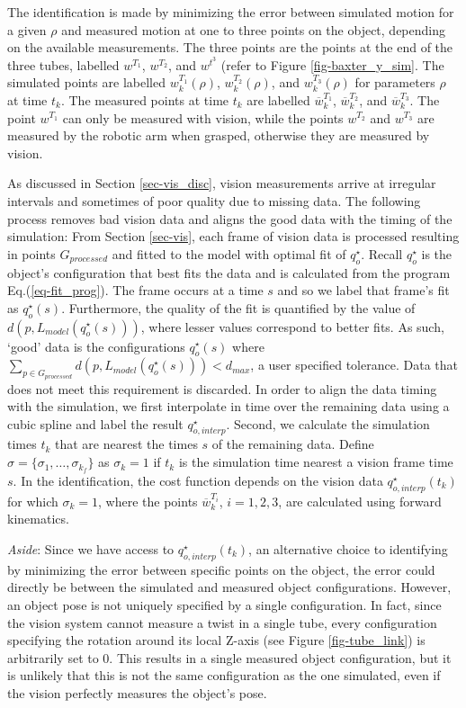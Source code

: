 \documentclass[runningheads,a4paper]{llncs}
\begin{document}
The identification is made by minimizing the error between simulated motion for a given $\rho$ and measured motion at one to three points on the object, depending on the available measurements. The three points are the points at the end of the three tubes, labelled $w^{T_1}$, $w^{T_2}$, and $w^{t^3}$ (refer to Figure \ref{fig-baxter_y_sim}. The simulated points are labelled $w_k^{T_1}(\rho)$, $w_k^{T_2} (\rho)$, and $w_k^{T_3}(\rho)$ for parameters $\rho$ at time $t_k$. The measured points at time $t_k$ are labelled $\overline{w}_k^{T_1}$, $\overline{w}_k^{T_2}$, and $\overline{w}_k^{T_3}$. The point $w^{T_1}$ can only be measured with vision, while the points $w^{T_2}$ and $w^{T_3}$ are measured by the robotic arm when grasped, otherwise they are measured by vision.  

As discussed in Section \ref{sec-vis_disc}, vision measurements arrive at irregular intervals and sometimes of poor quality due to missing data.  The following process removes bad vision data and aligns the good data with the timing of the simulation: From Section \ref{sec-vis}, each frame of vision data is processed resulting in points $G_{processed}$ and fitted to the model with optimal fit of $q_o^\star$. Recall $q_o^\star$ is the object's configuration that best fits the data and is calculated from the program Eq.(\ref{eq-fit_prog}). The frame occurs at a time $s$ and so we label that frame's fit as $q_o^\star(s)$.  Furthermore, the quality of the fit is quantified by the value of $d(p,L_{model}(q_o^\star(s)))$, where lesser values correspond to better fits. As such, `good' data is the configurations $q_o^\star(s)$ where $\sum_{p\in G_{processed}}d(p,L_{model}(q_o^\star(s)))<d_{max}$, a user specified tolerance. Data that does not meet this requirement is discarded.  In order to align the data timing with the simulation, we first interpolate in time over the remaining data using a cubic spline and label the result $q_{o,interp}^\star$.  Second, we calculate the simulation times $t_k$ that are nearest the times $s$ of the remaining data. Define $\sigma = \{\sigma_1,\ldots,\sigma_{k_f}\}$ as $\sigma_k = 1$ if $t_k$ is the simulation time nearest a vision frame time $s$.  In the identification, the cost function depends on the vision data $q_{o,interp}^\star(t_k)$ for which $\sigma_k = 1$, where the points $\overline{w}_k^{T_i}$, $i = 1,2,3$, are calculated using forward kinematics.

\emph{Aside}: Since we have access to $q_{o,interp}^\star(t_k)$, an alternative choice to identifying by minimizing the error between specific points on the object, the error could directly be between the simulated and measured object configurations. However, an object pose is not uniquely specified by a single configuration. In fact, since the vision system cannot measure a twist in a single tube, every configuration specifying the rotation around its local Z-axis (see Figure \ref{fig-tube_link}) is arbitrarily set to 0. This results in a single measured object configuration, but it is unlikely that this is not the same configuration as the one simulated, even if the vision perfectly measures the object's pose.
\end{document}
